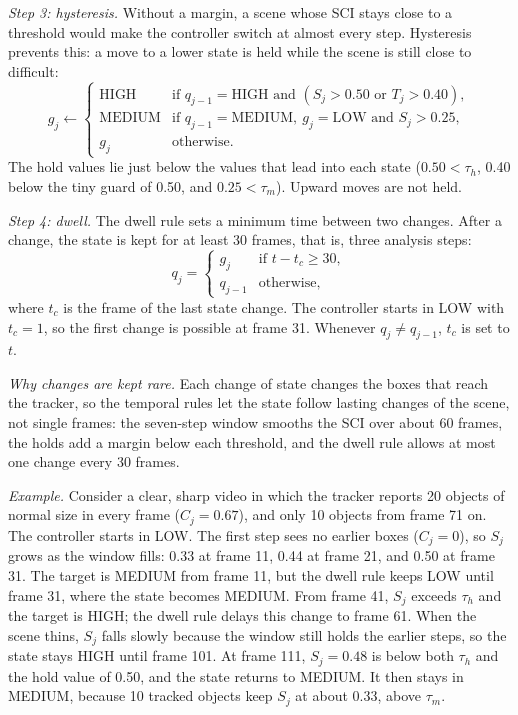 \emph{Step 3: hysteresis.} Without a margin, a scene whose SCI stays close to a threshold would make the controller switch at almost every step. Hysteresis prevents this: a move to a lower state is held while the scene is still close to difficult:
\begin{equation}
g_j\leftarrow\begin{cases}
\text{HIGH}   & \text{if } q_{j-1}=\text{HIGH} \text{ and } (S_j>0.50 \text{ or } T_j>0.40),\\
\text{MEDIUM} & \text{if } q_{j-1}=\text{MEDIUM},\ g_j=\text{LOW} \text{ and } S_j>0.25,\\
g_j           & \text{otherwise.}
\end{cases}
\label{eq:ac-hold}
\end{equation}
The hold values lie just below the values that lead into each state ($0.50<\tau_h$, 0.40 below the tiny guard of 0.50, and $0.25<\tau_m$). Upward moves are not held.

\emph{Step 4: dwell.} The dwell rule sets a minimum time between two changes. After a change, the state is kept for at least 30 frames, that is, three analysis steps:
\begin{equation}
q_j=\begin{cases}
g_j     & \text{if } t-t_c\ge30,\\
q_{j-1} & \text{otherwise,}
\end{cases}
\label{eq:ac-dwell}
\end{equation}
where $t_c$ is the frame of the last state change. The controller starts in LOW with $t_c=1$, so the first change is possible at frame 31. Whenever $q_j\ne q_{j-1}$, $t_c$ is set to $t$.

\emph{Why changes are kept rare.} Each change of state changes the boxes that reach the tracker, so the temporal rules let the state follow lasting changes of the scene, not single frames: the seven-step window smooths the SCI over about 60 frames, the holds add a margin below each threshold, and the dwell rule allows at most one change every 30 frames.

\emph{Example.} Consider a clear, sharp video in which the tracker reports 20 objects of normal size in every frame ($C_j=0.67$), and only 10 objects from frame 71 on. The controller starts in LOW. The first step sees no earlier boxes ($C_j=0$), so $S_j$ grows as the window fills: 0.33 at frame 11, 0.44 at frame 21, and 0.50 at frame 31. The target is MEDIUM from frame 11, but the dwell rule keeps LOW until frame 31, where the state becomes MEDIUM. From frame 41, $S_j$ exceeds $\tau_h$ and the target is HIGH; the dwell rule delays this change to frame 61. When the scene thins, $S_j$ falls slowly because the window still holds the earlier steps, so the state stays HIGH until frame 101. At frame 111, $S_j=0.48$ is below both $\tau_h$ and the hold value of 0.50, and the state returns to MEDIUM. It then stays in MEDIUM, because 10 tracked objects keep $S_j$ at about 0.33, above $\tau_m$.

